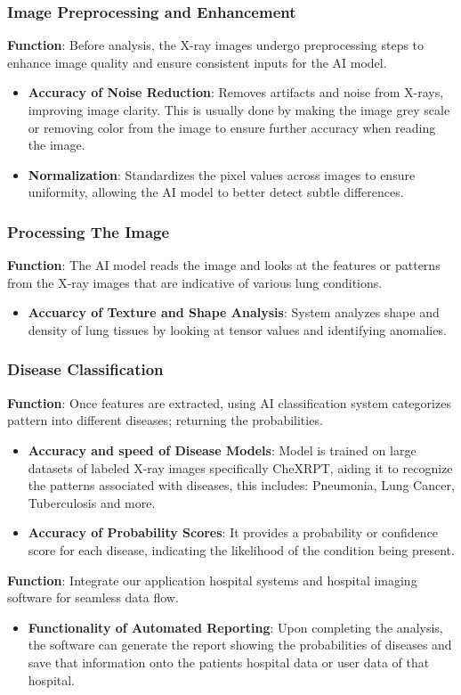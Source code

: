 \documentclass[12pt, titlepage]{article}
\begin{document}
\subsubsection{Image Preprocessing and Enhancement}
\textbf{Function}: Before analysis, the X-ray images undergo preprocessing steps to enhance image quality and ensure consistent inputs for the AI model.
\begin{itemize}
    \item \textbf{Accuracy of Noise Reduction}: Removes artifacts and noise from X-rays, improving image clarity. This is usually done by making the image grey scale or removing color from the image to ensure further accuracy when reading the image. 
    \item \textbf{Normalization}: Standardizes the pixel values across images to ensure uniformity, allowing the AI model to better detect subtle differences.
\end{itemize}

\subsubsection{Processing The Image}
\textbf{Function}: The AI model reads the image and looks at the features or patterns from the X-ray images that are indicative of various lung conditions.
\begin{itemize}
    \item \textbf{Accuarcy of Texture and Shape Analysis}: System analyzes shape and density of lung tissues by looking at tensor values and identifying anomalies.
\end{itemize}
\subsubsection{Disease Classification}
\textbf{Function}: Once features are extracted, using AI classification system categorizes pattern  into different diseases; returning the probabilities.
    \begin{itemize}
        \item \textbf{Accuracy and speed of Disease Models}: Model is trained on large datasets of labeled X-ray images specifically CheXRPT, aiding it to recognize the patterns associated with diseases, this includes: Pneumonia, Lung Cancer, Tuberculosis and more.
        \item \textbf{Accuracy  of Probability Scores}: It provides a probability or confidence score for each disease, indicating the likelihood of the condition being present.
    \end{itemize}
    \textbf{Function}: Integrate our application hospital systems and hospital imaging software  for seamless data flow.
    \begin{itemize}
            \item \textbf{Functionality of Automated Reporting}: Upon completing the analysis, the software can generate the report showing the probabilities of diseases and save that information onto the patients hospital data or user data of that hospital.
    \end{itemize}
\end{document}
